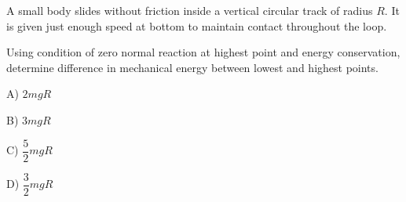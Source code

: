 \documentclass[12pt]{article}
\begin{document}
\begin{enumerate}
A small body slides without friction inside a vertical circular track of radius $R$. It is given just enough speed at bottom to maintain contact throughout the loop.

Using condition of zero normal reaction at highest point and energy conservation, determine difference in mechanical energy between lowest and highest points.



\begin{center}
\end{center}


A) $2mgR$

B) $3mgR$

C) $\dfrac{5}{2}mgR$

D) $\dfrac{3}{2}mgR$


\end{enumerate}
\end{document}
